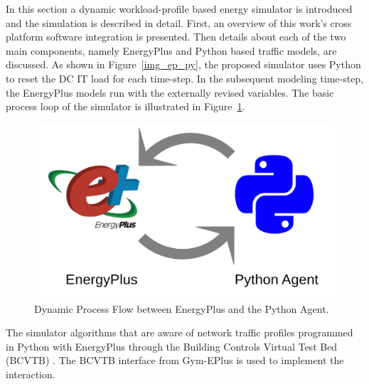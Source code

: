In this section a dynamic workload-profile based energy simulator is introduced and the simulation is described in detail. First, an overview of this work's cross platform software integration is presented. Then details about each of the two main components, namely EnergyPlus and Python based traffic models, are discussed.  As shown in Figure~\ref{img_ep_py}, the proposed simulator uses Python to reset the DC IT load for each time-step. In the subsequent modeling time-step, the EnergyPlus models run with the externally revised variables. The basic process loop of the simulator is illustrated in Figure~\ref{fig:dyna-bem}.



\begin{figure}
\centering
\includegraphics[scale=.10]{traffic_profile/images/agent_bem.png}
\caption{Dynamic Process Flow between EnergyPlus and the Python Agent.}
\label{fig:dyna-bem}
\end{figure} 

The simulator  algorithms that are aware of network traffic profiles programmed in Python  with EnergyPlus through the Building Controls Virtual Test Bed (BCVTB) \citep{wetter16}. The BCVTB interface from Gym-EPlus \citep{zhang19} is used to implement the interaction.  

